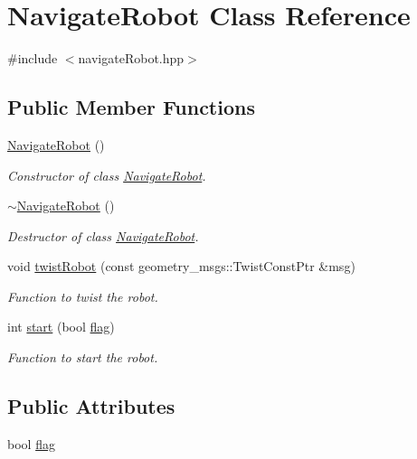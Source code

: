 \hypertarget{class_navigate_robot}{}\section{Navigate\+Robot Class Reference}
\label{class_navigate_robot}


{\ttfamily \#include $<$navigate\+Robot.\+hpp$>$}

\subsection*{Public Member Functions}
\begin{DoxyCompactItemize}
\item 
\hyperlink{class_navigate_robot_ac27678ab7ff5b0416f661e899a50f9b4}{Navigate\+Robot} ()
\begin{DoxyCompactList}\small\item\em Constructor of class \hyperlink{class_navigate_robot}{Navigate\+Robot}. \end{DoxyCompactList}\item 
\hyperlink{class_navigate_robot_a004a6768d65abf86fba9e3fa586c54e6}{$\sim$\+Navigate\+Robot} ()
\begin{DoxyCompactList}\small\item\em Destructor of class \hyperlink{class_navigate_robot}{Navigate\+Robot}. \end{DoxyCompactList}\item 
void \hyperlink{class_navigate_robot_a1382b2a30d0dccfbe2e63132f3cbd880}{twist\+Robot} (const geometry\+\_\+msgs\+::\+Twist\+Const\+Ptr \&msg)
\begin{DoxyCompactList}\small\item\em Function to twist the robot. \end{DoxyCompactList}\item 
int \hyperlink{class_navigate_robot_ad02fc9f2481f002b7ad3b654a8ec80d2}{start} (bool \hyperlink{class_navigate_robot_a6eadd58c6c56d73ff90e3d7ebd94bb3d}{flag})
\begin{DoxyCompactList}\small\item\em Function to start the robot. \end{DoxyCompactList}\end{DoxyCompactItemize}
\subsection*{Public Attributes}
\begin{DoxyCompactItemize}
\item 
bool \hyperlink{class_navigate_robot_a6eadd58c6c56d73ff90e3d7ebd94bb3d}{flag}
\end{DoxyCompactItemize}


